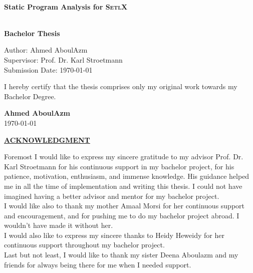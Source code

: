 \documentclass[11pt]{report}
\begin{document}
\begin{center}
\vspace{2cm}
\\
\begin{huge}
\textbf{Static Program Analysis for \textsc{SetlX}}
\end{huge}
\\[2cm]
\textbf{Bachelor Thesis}
\begin{tabbing}\hspace{5cm}
Author: Ahmed AboulAzm\\\hspace{5cm}
Supervisor: Prof. Dr. Karl Stroetmann\\\hspace{5cm}
Submission Date: {\today}
\end{tabbing}
\end{center}
\vspace{1.5cm}
I hereby certify that the thesis comprises only my original work towards my Bachelor Degree.
\begin{flushright}
\textbf{Ahmed AboulAzm}\\
\today
\end{flushright}

\pagebreak

\begin{center}
\begin{Large}
\underline{\textbf{ACKNOWLEDGMENT}}
\end{Large}
\end{center}

\vspace{2cm}

\begin{Large}
Foremost I would like to express my sincere gratitude to my advisor Prof. Dr. Karl Stroetmann for his continuous support in my bachelor project, for his patience, motivation, enthusiasm, and immense knowledge. His guidance helped me in all the time of implementation and writing this thesis. I could not have imagined having a better advisor and mentor for my bachelor project.\\

I would like also to thank my mother Amaal Morsi for her continuous support and encouragement, and for pushing me to do my bachelor project abroad. I wouldn't have made it without her.\\

I would also like to express my sincere thanks to Heidy Heweidy for her continuous support throughout my bachelor project.\\

Last but not least, I would like to thank my sister Deena Aboulazm and my friends for always being there for me when I needed support.
\end{Large}
\end{document}
